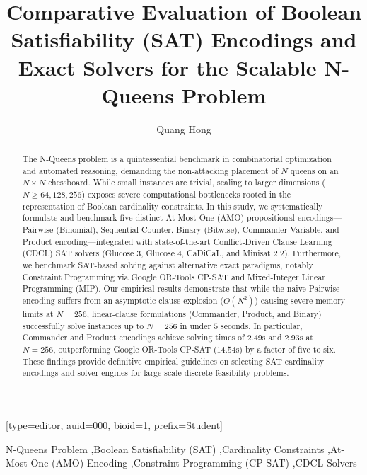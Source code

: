 \documentclass[a4paper,fleqn]{cas-sc}
\begin{document}
\let\WriteBookmarks\relax
\def\floatpagepagefraction{1}
\def\textpagefraction{.001}

\title[mode = title]{Comparative Evaluation of Boolean Satisfiability (SAT) Encodings and Exact Solvers for the Scalable N-Queens Problem}

\author[1]{Quang Hong}[type=editor, auid=000, bioid=1, prefix=Student]
\cormark[1]
\address[1]{Khoa Khoa hoc May tinh, Truong Dai hoc Bach Khoa (Project 1 - Cac van de hien dai KHMT)}


\begin{abstract}
The N-Queens problem is a quintessential benchmark in combinatorial optimization and automated reasoning, demanding the non-attacking placement of $N$ queens on an $N \times N$ chessboard. While small instances are trivial, scaling to larger dimensions ($N \ge 64, 128, 256$) exposes severe computational bottlenecks rooted in the representation of Boolean cardinality constraints. In this study, we systematically formulate and benchmark five distinct At-Most-One (AMO) propositional encodings---Pairwise (Binomial), Sequential Counter, Binary (Bitwise), Commander-Variable, and Product encoding---integrated with state-of-the-art Conflict-Driven Clause Learning (CDCL) SAT solvers (Glucose 3, Glucose 4, CaDiCaL, and Minisat 2.2). Furthermore, we benchmark SAT-based solving against alternative exact paradigms, notably Constraint Programming via Google OR-Tools CP-SAT and Mixed-Integer Linear Programming (MIP). Our empirical results demonstrate that while the naive Pairwise encoding suffers from an asymptotic clause explosion ($O(N^2)$) causing severe memory limits at $N = 256$, linear-clause formulations (Commander, Product, and Binary) successfully solve instances up to $N = 256$ in under $5$ seconds. In particular, Commander and Product encodings achieve solving times of $2.49$s and $2.93$s at $N = 256$, outperforming Google OR-Tools CP-SAT ($14.54$s) by a factor of five to six. These findings provide definitive empirical guidelines on selecting SAT cardinality encodings and solver engines for large-scale discrete feasibility problems.
\end{abstract}

\begin{keywords}
N-Queens Problem \sep Boolean Satisfiability (SAT) \sep Cardinality Constraints \sep At-Most-One (AMO) Encoding \sep Constraint Programming (CP-SAT) \sep CDCL Solvers
\end{keywords}
\end{document}
